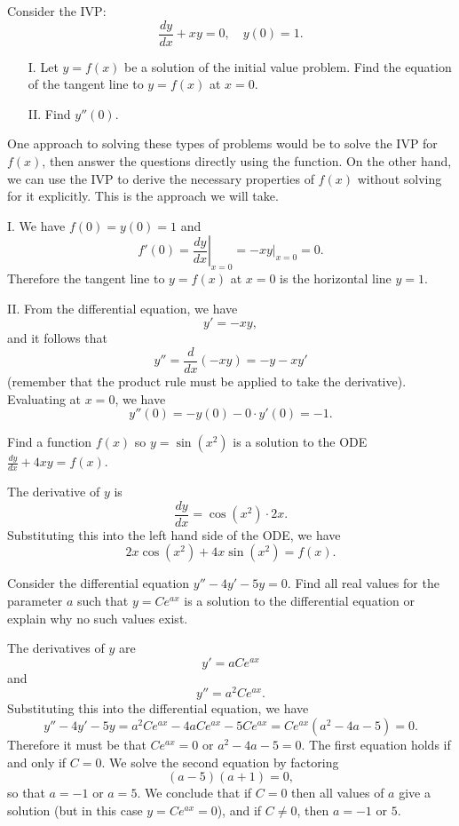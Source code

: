 \documentclass[]{ximera}
\begin{document}
\begin{problem} 
Consider the IVP: $$\frac{dy}{dx} +xy =0, \quad y(0)=1.$$  

\begin{itemize}
\item[I.]  Let $y=f(x)$ be a solution of the initial value problem.  Find the equation of the tangent line to $y=f(x)$ at $x=0$.
\item[II.] Find  $y''(0)$.
\end{itemize}

\begin{solution}
One approach to solving these types of problems would be to solve the IVP for $f(x)$, then answer the questions directly using the function. On the other hand, we can use the IVP to derive the necessary properties of $f(x)$ without solving for it explicitly. This is the approach we will take.

I. We have $f(0) = y(0) = 1$ and 
$$
f'(0) = \left.\frac{dy}{dx}\right|_{x=0} = \left.-xy\right|_{x=0} = 0.
$$
Therefore the tangent line to $y=f(x)$ at $x=0$ is the horizontal line $y=1$. 

II. From the differential equation, we have
$$
y' = -xy,
$$
and it follows that
$$
y'' = \frac{d}{dx}(-xy) = -y - xy'
$$
(remember that the product rule must be applied to take the derivative). Evaluating at $x=0$, we have
$$
y''(0) = -y(0)-0 \cdot y'(0) = -1.
$$
\end{solution}
\end{problem}


\begin{problem} 
Find a function $f(x)$ so $y=\sin(x^2)$ is a solution to the ODE $\frac{dy}{dx}+4xy = f(x)$.

\begin{solution}
The derivative of $y$ is 
$$
\frac{dy}{dx} = \cos(x^2)\cdot 2x.
$$
Substituting this into the left hand side of the ODE, we have
$$
2x \cos(x^2)  + 4x \sin(x^2) = f(x).
$$
\end{solution}
\end{problem}


\begin{problem} 
Consider the differential equation $y''-4y'-5y = 0$.  Find all real values for the parameter $a$ such that $y=Ce^{ax}$ is a solution to the differential equation or explain why no such values exist.

\begin{solution}
The derivatives of $y$ are 
$$
y' = aC e^{ax}
$$
and 
$$
y'' = a^2 C e^{ax}.
$$
Substituting this into the differential equation, we have
$$
y'' - 4y' -5y = a^2 C e^{ax} - 4 aC e^{ax} - 5Ce^{ax} = C e^{ax}\left(a^2 - 4a - 5\right) = 0.
$$
Therefore it must be that $C e^{ax} = 0$ or $a^2 - 4a - 5 = 0$. The first equation holds if and only if $C = 0$. We solve the second equation by factoring
$$
(a-5)(a+1) = 0,
$$ 
so that $a=-1$ or $a=5$. We conclude that if $C=0$ then all values of $a$ give a solution (but in this case $y=Ce^{ax} = 0$), and if $C \neq 0$, then $a=-1$ or $5$. 
\end{solution}
\end{problem}
\end{document}
